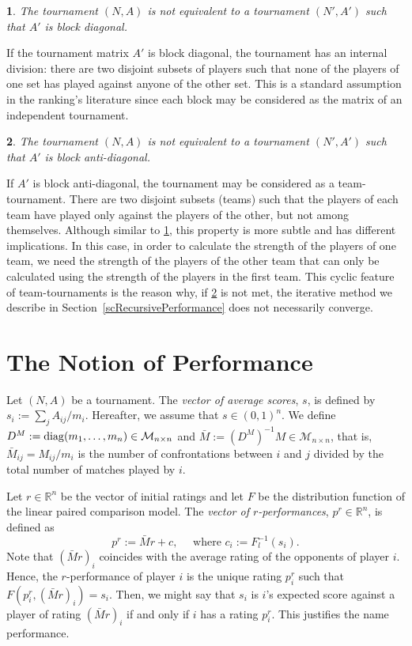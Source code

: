 \documentclass[a4paper,10pt]{article}
\newtheorem{property}{}
\theoremstyle{remark}
\newcommand{\TM}{A} %
\newcommand{\MM}{M} %
\newcommand{\DM}{D^\MM} %
\newcommand{\MS}{\mathcal M} %
\newcommand{\rv}{r} %
\newcommand{\pv}{p} %
\newcommand{\sv}{s} %
\begin{document}
\begin{property}\label{A:AnonDiag}
The tournament $(N,\TM)$ is not equivalent to a tournament
$(N',\TM')$ such that $\TM'$ is block diagonal.
\end{property}

If the tournament matrix $\TM'$ is block diagonal, the tournament
has an internal division: there are two disjoint subsets of
players such that none of the players of one set has played
against anyone of the other set. This is a standard assumption in
the ranking's literature since each block may be considered as the
matrix of an independent tournament.

\begin{property}\label{A:AnonAntiDiag}
The tournament $(N,\TM)$ is not equivalent to a tournament
$(N',\TM')$ such that $\TM'$ is block anti-diagonal.
\end{property}

If $\TM'$ is block anti-diagonal, the tournament may be considered
as a team-tournament. There are two disjoint subsets (teams) such
that the players of each team have played only against the players
of the other, but not among themselves. Although similar to
\ref{A:AnonDiag}, this property is more subtle and has different
implications. In this case, in order to calculate the strength of
the players of one team, we need the strength of the players of
the other team that can only be calculated using the strength of
the players in the first team. This cyclic feature of
team-tournaments is the reason why, if \ref{A:AnonAntiDiag} is not
met, the iterative method we describe in
Section~\ref{scRecursivePerformance} does not necessarily
converge.

\section{The Notion of Performance}\label{scPerformance}

Let $(N,\TM)$ be a tournament. The \emph{vector of average scores}, $\sv$, is defined by
$\sv_i:=\sum_j A_{ij}/m_i$. Hereafter, we assume that $\sv \in (0,1)^n$. We define
$\DM:=\mathop{\rm diag}(m_1,\dots,m_n)\in \MS_{n\times n}$ and $\bar{\MM}:=(\DM)^{-1}\MM\in \MS_{n\times n}$, that is,
$\bar{\MM}_{ij}=\MM_{ij}/m_i$ is the number of confrontations
between $i$ and $j$ divided by the total number of matches played
by $i$.

Let $\rv\in \mathbb R^n$ be the vector of initial ratings and let
$F$ be the distribution function of the linear paired comparison model. The \emph{vector of $\rv$-performances}, $\pv^\rv \in \mathbb R^n$, is defined as
\[
\pv^{\rv}:= \bar \MM \rv+c, \quad\text{ where } c_i:=F_l^{-1}(\sv_i).
\]
Note that $(\bar \MM\rv)_i$ coincides with the average rating of
the opponents of player $i$. Hence, the $\rv$-performance of player $i$ is
the unique rating $p^\rv_i$ such that $F(\pv^\rv_i,(\bar \MM \rv)_i)=\sv_i$. Then, we might say that $\sv_i$ is $i$'s expected score against a player of rating $(\bar \MM \rv)_i$ if and only if $i$ has a rating $\pv^\rv_i$. This
justifies the name performance. 
\end{document}

